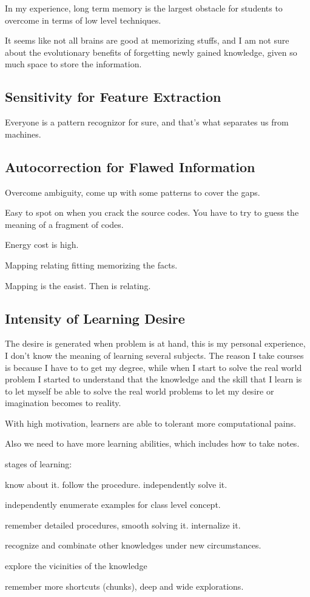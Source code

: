 In my experience, long term memory is the largest obstacle for students to overcome in terms of low level techniques.

It seems like not all brains are good at memorizing stuffs, and I am not sure about the evolutionary benefits of forgetting newly gained knowledge, given so much space to store the information.

\subsection{Sensitivity for Feature Extraction}

Everyone is a pattern recognizor for sure, and that's what separates us from machines.

\subsection{Autocorrection for Flawed Information}

Overcome ambiguity, come up with some patterns to cover the gaps.

Easy to spot on when you crack the source codes. You have to try to guess the meaning of a fragment of codes.

Energy cost is high.

Mapping relating fitting memorizing the facts.

Mapping is the easist. Then is relating.

\subsection{Intensity of Learning Desire}

The desire is generated when problem is at hand, this is my personal experience, I don't know the meaning of learning several subjects. The reason I take courses is because I have to to get my degree, while when I start to solve the real world problem I started to understand that the knowledge and the skill that I learn is to let myself be able to solve the real world problems to let my desire or imagination becomes to reality.

With high motivation, learners are able to tolerant more computational pains.

Also we need to have more learning abilities, which includes how to take notes.





stages of learning:

know about it. follow the procedure. independently solve it.

independently enumerate examples for class level concept.

remember detailed procedures, smooth solving it. internalize it.

recognize and combinate other knowledges under new circumstances.

explore the vicinities of the knowledge

remember more shortcuts (chunks), deep and wide explorations.
